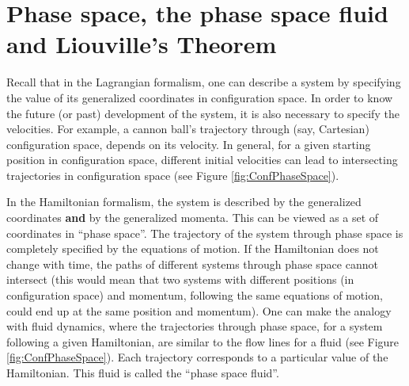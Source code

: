 \section{Phase space, the phase space fluid and Liouville's Theorem}
Recall that in the Lagrangian formalism, one can describe a system by specifying the value of its generalized coordinates in configuration space. In order to know the future (or past) development of the system, it is also necessary to specify the velocities. For example, a cannon ball's trajectory through (say, Cartesian) configuration space, depends on its velocity. In general, for a given starting position in configuration space, different initial velocities can lead to intersecting trajectories in configuration space (see Figure \ref{fig:ConfPhaseSpace}).

In the Hamiltonian formalism, the system is described by the generalized coordinates \textbf{and} by the generalized momenta. This can be viewed as a set of coordinates in ``phase space''. The trajectory of the system through phase space is completely specified by the equations of motion. If the Hamiltonian does not change with time, the paths of different systems through phase space cannot intersect (this would mean that two systems with different positions (in configuration space) and momentum, following the same equations of motion, could end up at the same position and momentum). One can make the analogy with fluid dynamics, where the trajectories through phase space, for a system following a given Hamiltonian, are similar to the flow lines for a fluid (see Figure \ref{fig:ConfPhaseSpace}). Each trajectory corresponds to a particular value of the Hamiltonian. This fluid is called the ``phase space fluid''.


